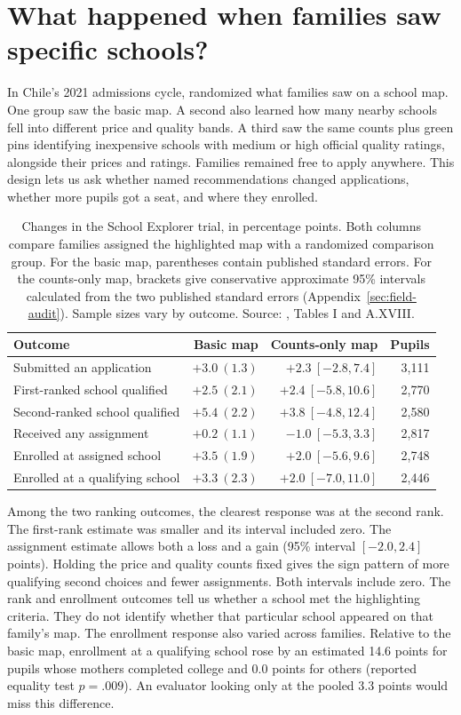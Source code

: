 \section{What happened when families saw specific schools?}\label{sec:field}

In Chile's 2021 admissions cycle, \citet{schoolSearch} randomized what families saw on a school map. One group saw the basic map. A second also learned how many nearby schools fell into different price and quality bands. A third saw the same counts plus green pins identifying inexpensive schools with medium or high official quality ratings, alongside their prices and ratings. Families remained free to apply anywhere. This design lets us ask whether named recommendations changed applications, whether more pupils got a seat, and where they enrolled.

\begin{table}[ht]\centering\small
\caption{Changes in the School Explorer trial, in percentage points. Both columns compare families assigned the highlighted map with a randomized comparison group. For the basic map, parentheses contain published standard errors. For the counts-only map, brackets give conservative approximate 95\% intervals calculated from the two published standard errors (Appendix~\ref{sec:field-audit}). Sample sizes vary by outcome. Source: \citet{schoolSearch}, Tables I and A.XVIII.}\label{tab:field}
\begin{tabular}{@{}lrrr@{}}\toprule
Outcome & Basic map & Counts-only map & Pupils\\\midrule
Submitted an application & $+3.0\ (1.3)$ & $+2.3\ [-2.8,7.4]$ & 3,111\\
First-ranked school qualified & $+2.5\ (2.1)$ & $+2.4\ [-5.8,10.6]$ & 2,770\\
Second-ranked school qualified & $+5.4\ (2.2)$ & $+3.8\ [-4.8,12.4]$ & 2,580\\
Received any assignment & $+0.2\ (1.1)$ & $-1.0\ [-5.3,3.3]$ & 2,817\\
Enrolled at assigned school & $+3.5\ (1.9)$ & $+2.0\ [-5.6,9.6]$ & 2,748\\
Enrolled at a qualifying school & $+3.3\ (2.3)$ & $+2.0\ [-7.0,11.0]$ & 2,446\\\bottomrule
\end{tabular}
\end{table}

Among the two ranking outcomes, the clearest response was at the second rank. The first-rank estimate was smaller and its interval included zero. The assignment estimate allows both a loss and a gain (95\% interval $[-2.0,2.4]$ points). Holding the price and quality counts fixed gives the sign pattern of more qualifying second choices and fewer assignments. Both intervals include zero. The rank and enrollment outcomes tell us whether a school met the highlighting criteria. They do not identify whether that particular school appeared on that family's map. The enrollment response also varied across families. Relative to the basic map, enrollment at a qualifying school rose by an estimated 14.6 points for pupils whose mothers completed college and 0.0 points for others (reported equality test $p=.009$). An evaluator looking only at the pooled 3.3 points would miss this difference.

